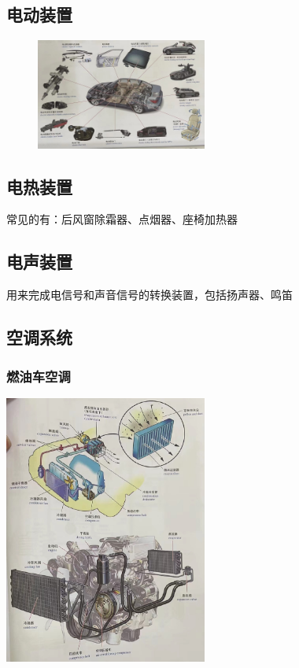 \subsection{电动装置}
	\begin{figure}[htbp]
		\centering
		\includegraphics[width=0.5\textwidth]{5-18}
	\end{figure}

\subsection{电热装置}
	常见的有：后风窗除霜器、点烟器、座椅加热器

\subsection{电声装置}
	用来完成电信号和声音信号的转换装置，包括扬声器、鸣笛
	
\subsection{空调系统}
	\subsubsection{燃油车空调}
		\begin{center}
			\includegraphics[width=0.5\textwidth]{5-19}
		\end{center}
